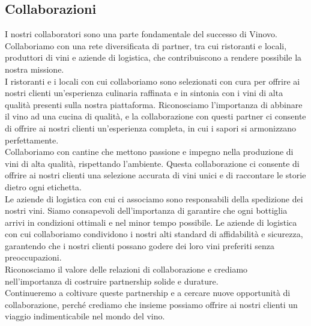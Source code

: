 \documentclass[12pt, a4paper]{article}
\newcommand{\meskip}{\medskip \\}
\begin{document}
\subsection{Collaborazioni}
I nostri collaboratori sono una parte fondamentale del successo di Vinovo.
Collaboriamo con una rete diversificata di partner, tra cui ristoranti e locali, produttori di vini e aziende di logistica, che contribuiscono a rendere possibile la nostra missione.\meskip
I ristoranti e i locali con cui collaboriamo sono selezionati con cura per offrire ai nostri clienti un'esperienza culinaria raffinata e in sintonia con i vini di alta qualità presenti sulla nostra piattaforma.
Riconosciamo l'importanza di abbinare il vino ad una cucina di qualità, e la collaborazione con questi partner ci consente di offrire ai nostri clienti un'esperienza completa, in cui i sapori si armonizzano perfettamente.\meskip
Collaboriamo con cantine che mettono passione e impegno nella produzione di vini di alta qualità, rispettando l'ambiente.
Questa collaborazione ci consente di offrire ai nostri clienti una selezione accurata di vini unici e di raccontare le storie dietro ogni etichetta.\meskip
Le aziende di logistica con cui ci associamo sono responsabili della spedizione dei nostri vini.
Siamo consapevoli dell'importanza di garantire che ogni bottiglia arrivi in condizioni ottimali e nel minor tempo possibile.
Le aziende di logistica con cui collaboriamo condividono i nostri alti standard di affidabilità e sicurezza, garantendo che i nostri clienti possano godere dei loro vini preferiti senza preoccupazioni.\meskip
Riconosciamo il valore delle relazioni di collaborazione e crediamo nell'importanza di costruire partnership solide e durature.\meskip
Continueremo a coltivare queste partnership e a cercare nuove opportunità di collaborazione, perché crediamo che insieme possiamo offrire ai nostri clienti un viaggio indimenticabile nel mondo del vino.\newpage
\end{document}
